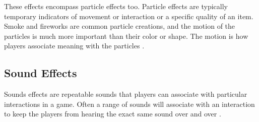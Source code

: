These effects encompass particle effects too. Particle effects are typically temporary indicators of movement or interaction or a specific quality of an item. Smoke and fireworks are common particle creations, and the motion of the particles is much more important than their color or shape. The motion is how players associate meaning with the particles \cite{swink2009game}.

\subsection{Sound Effects}

Sounds effects are repeatable sounds that players can associate with particular interactions in a game. Often a range of sounds will associate with an interaction to keep the players from hearing the exact same sound over and over \cite{swink2009game}.
